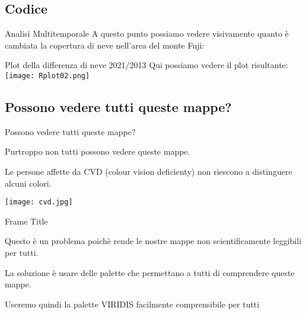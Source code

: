 \documentclass{beamer}
\begin{document}
\subsection{Codice}

\begin{frame}{Analisi Multitemporale}
A questo punto possiamo vedere visivamente quanto è cambiata la copertura di neve nell'area del monte Fuji:
\bigskip
\scriptsize
    
\end{frame}



\begin{frame}{Plot della differenza di neve 2021/2013}
Qui possiamo vedere il plot risultante:
\bigskip
    \centering
    \texttt{[image: Rplot02.png]}   

\end{frame}

\subsection{Possono vedere tutti queste mappe?}

\begin{frame}{Possono vedere tutti queste mappe?}\pause

Purtroppo non tutti possono vedere queste mappe.

Le persone affette da CVD (colour vision deficienty) non riescono a distinguere alcuni colori. 

\centering
 \texttt{[image: cvd.jpg]}   

\end{frame}


\begin{frame}{Frame Title}
    
Questo è un problema poichè rende le nostre mappe non scientificamente leggibili per tutti.

La soluzione è usare delle palette che permettano a tutti di comprendere queste mappe.

Useremo quindi la palette VIRIDIS facilmente comprensibile per tutti 

\end{frame}    
\end{document}
